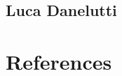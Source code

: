 \documentclass[10pt,openany]{book}
\begin{document}
		

	\section{Luca Danelutti}

		

\chapter{References}\label{chapt:sum}

		

\pagebreak




\end{document}
